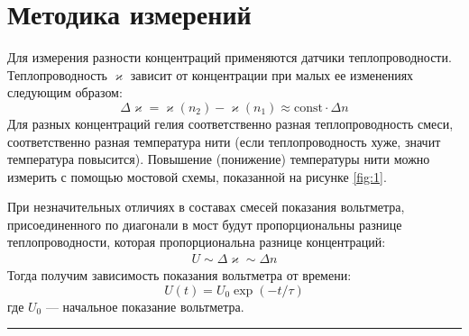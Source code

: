 \documentclass[a4paper,12pt]{report}
\begin{document}
    \section{Методика измерений}
    \begin{multicols}{2}
        Для измерения разности концентраций применяются датчики теплопроводности. Теплопроводность $\varkappa$ зависит от концентрации при малых ее изменениях следующим образом:
        \begin{equation}
            \Delta\varkappa=\varkappa(n_2)-\varkappa(n_1)\approx\text{const}\cdot\Delta n
        \end{equation}
        Для разных концентраций гелия соответственно разная теплопроводность смеси, соответственно разная температура нити (если теплопроводность хуже, значит температура повысится). Повышение (понижение) температуры нити можно измерить с помощью мостовой схемы, показанной на рисунке \ref{fig:1}.

        При незначительных отличиях в составах смесей показания вольтметра, присоединенного по диагонали в мост будут пропорциональны разнице теплопроводности, которая пропорциональна разнице концентраций:
        \begin{gather*}
            U\sim\Delta\varkappa\sim\Delta n
        \end{gather*}
        Тогда получим зависимость показания вольтметра от времени:
        \begin{equation}
            U(t)=U_0\exp{(-t/\tau)}
        \end{equation}
        где $U_0$ --- начальное показание вольтметра.
    \end{multicols}
    \hrule 
\end{document}
